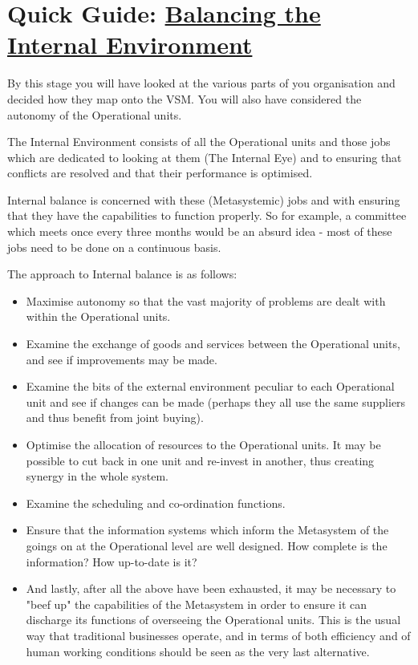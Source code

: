 \section*{Quick Guide: \href{https://vsmg.lrc.org.uk/5intbal.html}{Balancing the Internal Environment}}
By this stage you will have looked at the various parts of you organisation and decided how they map onto the VSM. You will also have considered the autonomy of the Operational units.

The Internal Environment consists of all the Operational units and those jobs which are dedicated to looking at them (The Internal Eye) and to ensuring that conflicts are resolved and that their performance is optimised.

Internal balance is concerned with these (Metasystemic) jobs and with ensuring that they have the capabilities to function properly. So for example, a committee which meets once every three months would be an absurd idea - most of these jobs need to be done on a continuous basis.

The approach to Internal balance is as follows:

\begin{itemize}
  \item Maximise autonomy so that the vast majority of problems are dealt with within the Operational units.

  \item Examine the exchange of goods and services between the Operational units, and see if improvements may be made.

  \item Examine the bits of the external environment peculiar to each Operational unit and see if changes can be made (perhaps they all use the same suppliers and thus benefit from joint buying).

  \item Optimise the allocation of resources to the Operational units. It may be possible to cut back in one unit and re-invest in another, thus creating synergy in the whole system.

  \item Examine the scheduling and co-ordination functions.

  \item Ensure that the information systems which inform the Metasystem of the goings on at the Operational level are well designed. How complete is the information? How up-to-date is it?

  \item And lastly, after all the above have been exhausted, it may be necessary to "beef up" the capabilities of the Metasystem in order to ensure it can discharge its functions of overseeing the Operational units. This is the usual way that traditional businesses operate, and in terms of both efficiency and of human working conditions should be seen as the very last alternative.

\end{itemize}

